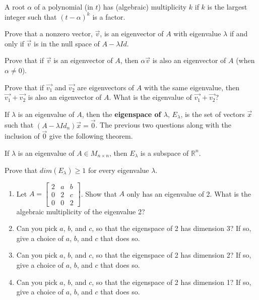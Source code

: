 A root $\alpha$ of a polynomial (in $t$) has (algebraic) multiplicity $k$ if $k$ is the largest integer such that $(t-\alpha)^k$ is a factor.

\bq Prove that a nonzero vector, $\vec{v}$, is an eigenvector of $A$ with eigenvalue $\lambda$ if and only if $\vec{v}$ is in the null space of $A-\lambda Id$.
\eq

\bq Prove that if $\vec{v}$ is an eigenvector of $A$, then $\alpha \vec{v}$ is also an eigenvector of $A$ (when $\alpha \neq 0$).
\eq

\bq Prove that if $\vec{v_1}$ and $\vec{v_2}$ are eigenvectors of $A$ with the same eigenvalue, then $\vec{v_1}+\vec{v_2}$ is also an eigenvector of $A$. What is the eigenvalue of $\vec{v_1}+\vec{v_2}$?
\eq

\begin{definition}
If $\lambda$ is an eigenvalue of $A$, then the \textbf{eigenspace of $\lambda$}, $E_\lambda$, is the set of vectors $\vec{x}$ such that $(A-\lambda Id_n)\vec{x}=\vec{0}$. The previous two questions along with the inclusion of $\vec{0}$ give the following theorem.
\end{definition}
\begin{theorem} If $\lambda$ is an eigenvalue of $A \in M_{n \times n}$, then $E_\lambda$ is a subspace of $\mathbb{R}^n$.
\end{theorem}

\bq Prove that $dim(E_\lambda) \geq 1$ for every eigenvalue $\lambda$.
\eq

\question\label{q92} \begin{enumerate} \item Let $A =\begin{bmatrix} 2 &a&b\\0&2&c\\0&0&2 \end{bmatrix}$. Show that $A$ only has an eigenvalue of 2. What is the algebraic multiplicity of the eigenvalue 2?
\item Can you pick $a$, $b$, and $c$, so that the eigenspace of 2 has dimension 3? If so, give a choice of $a$, $b$, and $c$ that does so.
\item Can you pick $a$, $b$, and $c$, so that the eigenspace of 2 has dimension 2? If so, give a choice of $a$, $b$, and $c$ that does so.
\item Can you pick $a$, $b$, and $c$, so that the eigenspace of 2 has dimension 1? If so, give a choice of $a$, $b$, and $c$ that does so.
\end{enumerate}

